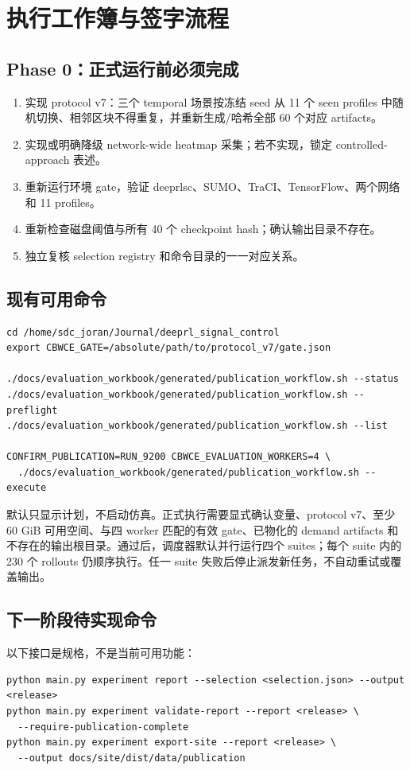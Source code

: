 \chapter{执行工作簿与签字流程}

\section{Phase 0：正式运行前必须完成}
\begin{enumerate}
  \item 实现 protocol v7：三个 temporal 场景按冻结 seed 从 11 个 seen profiles 中随机切换、相邻区块不得重复，并重新生成/哈希全部 60 个对应 artifacts。
  \item 实现或明确降级 network-wide heatmap 采集；若不实现，锁定 controlled-approach 表述。
  \item 重新运行环境 gate，验证 deeprlsc、SUMO、TraCI、TensorFlow、两个网络和 11 profiles。
  \item 重新检查磁盘阈值与所有 40 个 checkpoint hash；确认输出目录不存在。
  \item 独立复核 selection registry 和命令目录的一一对应关系。
\end{enumerate}

\section{现有可用命令}
\begin{Verbatim}[fontsize=\small,breaklines=true]
cd /home/sdc_joran/Journal/deeprl_signal_control
export CBWCE_GATE=/absolute/path/to/protocol_v7/gate.json

./docs/evaluation_workbook/generated/publication_workflow.sh --status
./docs/evaluation_workbook/generated/publication_workflow.sh --preflight
./docs/evaluation_workbook/generated/publication_workflow.sh --list

CONFIRM_PUBLICATION=RUN_9200 CBWCE_EVALUATION_WORKERS=4 \
  ./docs/evaluation_workbook/generated/publication_workflow.sh --execute
\end{Verbatim}
 默认只显示计划，不启动仿真。正式执行需要显式确认变量、protocol v7、至少 60 GiB 可用空间、与四 worker 匹配的有效 gate、已物化的 demand artifacts 和不存在的输出根目录。通过后，调度器默认并行运行四个 suites；每个 suite 内的 230 个 rollouts 仍顺序执行。任一 suite 失败后停止派发新任务，不自动重试或覆盖输出。

\section{下一阶段待实现命令}
以下接口是规格，不是当前可用功能：
\begin{Verbatim}[fontsize=\small,breaklines=true]
python main.py experiment report --selection <selection.json> --output <release>
python main.py experiment validate-report --report <release> \
  --require-publication-complete
python main.py experiment export-site --report <release> \
  --output docs/site/dist/data/publication
\end{Verbatim}

